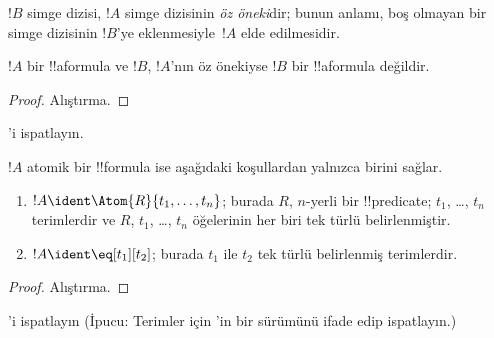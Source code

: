\documentclass[../../../include/open-logic-section]{subfiles}
\begin{document}
\begin{defn}[Öz önek]
$!B$ simge dizisi, $!A$ simge dizisinin \emph{öz öneki}dir; bunun
anlamı, boş olmayan bir simge dizisinin $!B$'ye eklenmesiyle~$!A$ elde
edilmesidir.
\end{defn}

\begin{lem}
$!A$ bir !!a{formula} ve $!B$, $!A$'nın öz önekiyse $!B$ bir
!!a{formula} değildir.
\end{lem}

\begin{proof}
Alıştırma.
\end{proof}

\begin{prob}
'i ispatlayın.
\end{prob}

\begin{prop}
$!A$ atomik bir !!{formula} ise aşağıdaki koşullardan yalnızca birini
sağlar.
\begin{enumerate}
\item $!A \ident \Atom{R}{t_1,\dots,t_n}$; burada $R$, $n$-yerli bir
  !!{predicate}; $t_1$, \dots, $t_n$ terimlerdir ve $R$,
  $t_1$, \dots, $t_n$ öğelerinin her biri tek türlü belirlenmiştir.
\item $!A \ident \eq[t_1][t_2]$; burada $t_1$ ile $t_2$ tek türlü
  belirlenmiş terimlerdir.
\end{enumerate}
\end{prop}

\begin{proof}
Alıştırma.
\end{proof}

\begin{prob}
'i ispatlayın (İpucu: Terimler
için 'in bir sürümünü ifade edip
ispatlayın.)
\end{prob}
\end{document}
